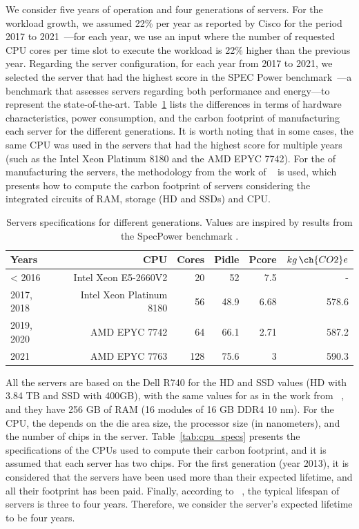 We consider five years of operation and four generations of servers. For the workload growth, we assumed 22\% per year as reported by Cisco for the period 2017 to 2021~\cite{cisco_global_cloud_index_2018}---for each year, we use an input where the number of requested CPU cores per time slot to execute the workload is 22\% higher than the previous year. Regarding the server configuration, for each year from 2017 to 2021, we selected the server that had the highest score in the SPEC Power benchmark~\cite{spec_power}---a benchmark that assesses servers regarding both performance and energy---to represent the state-of-the-art. Table~\ref{tab:servers_specs} lists the differences in terms of hardware characteristics, power consumption, and the carbon footprint of manufacturing each server for the different generations. It is worth noting that in some cases, the same CPU was used in the servers that had the highest score for multiple years (such as the Intel Xeon Platinum 8180 and the AMD EPYC 7742). For the  of manufacturing the servers, the methodology from the work of ~\citet{gupta2022_ACT} is used, which presents how to compute the carbon footprint of servers considering the integrated circuits of  RAM, storage (HD and SSDs) and CPU.

\begin{table}[h]
  \small
  \caption{Servers specifications for different generations. Values are inspired by results from the SpecPower benchmark \cite{spec_2014,spec_2017,spec_2016,spec_2019,spec_2021}.} \centering
  \label{tab:servers_specs} 
  \begin{tabular}{|l|r|r|r|r|r|}
  \hline    
  \textbf{Years} & \textbf{CPU} &   \textbf{Cores} & \textbf{Pidle}  & \textbf{Pcore}  & \textbf{$kg\,\ch{CO2}e$}  \\
  \hline
  < 2016      & Intel Xeon E5-2660V2 & 20 & 52 & 7.5  & -   \\
  \hline
  2017, 2018  & Intel Xeon Platinum 8180 & 56 & 48.9 & 6.68  & 578.6   \\
  \hline
  2019, 2020   & AMD EPYC 7742  & 64 & 66.1 & 2.71  & 587.2 \\
  \hline
  2021        & AMD EPYC 7763 & 128 & 75.6 & 3     & 590.3 \\
  \hline
\end{tabular}  
\end{table}

All the servers are based on the Dell R740 for the HD and SSD values (HD with 3.84 TB and SSD with 400GB), with the same values for  as in the work from ~\citet{gupta2022_ACT}, and they have 256 GB of RAM (16 modules of 16 GB DDR4 10 nm). For the CPU, the  depends on the die area size, the processor size (in nanometers), and the number of chips in the server. Table~\ref{tab:cpu_specs} presents the specifications of the CPUs used to compute their carbon footprint, and it is assumed that each server has two chips. For the first generation (year 2013), it is considered that the servers have been used more than their expected lifetime, and all their  footprint has been paid. Finally, according to ~\citet{datacenter_as_computer}, the typical lifespan of servers is three to four years. Therefore, we consider the server's expected lifetime to be four years.


